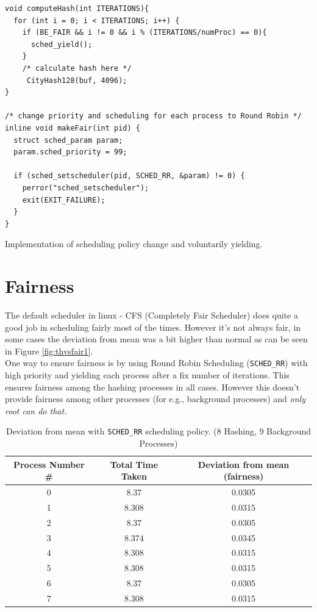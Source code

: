 \documentclass[10pt] {article}
\begin{document}
\begin{listing}[ht!]
\begin{verbatim}
void computeHash(int ITERATIONS){
  for (int i = 0; i < ITERATIONS; i++) {
    if (BE_FAIR && i != 0 && i % (ITERATIONS/numProc) == 0){
      sched_yield();
    }
    /* calculate hash here */
     CityHash128(buf, 4096);
}

/* change priority and scheduling for each process to Round Robin */
inline void makeFair(int pid) {
  struct sched_param param;
  param.sched_priority = 99;
	
  if (sched_setscheduler(pid, SCHED_RR, &param) != 0) {
    perror("sched_setscheduler");
    exit(EXIT_FAILURE);
  }
}
\end{verbatim}
\label{lst:sched}
\caption{Implementation of scheduling policy change and voluntarily yielding.}
\end{listing}

\section{Fairness}
The default scheduler in linux - CFS (Completely Fair Scheduler) does quite a good job in scheduling fairly most of the times. However it's not always fair, in some cases the deviation from mean was a bit higher than normal as can be seen in Figure \ref{fig:thvsfair1}. \\


\noindent One way to ensure fairness is by using Round Robin Scheduling (\texttt{SCHED\_RR}) with high priority and yielding each process after a fix number of iterations. This ensures fairness among the hashing processes in all cases. However this doesn't provide fairness among other processes (for e.g., background processes) and \emph{only root can do that.} \\

\begin{table}
\centering
\begin{tabular}{ |c|c|c|} 
 \hline
\textbf{Process Number \#} & \textbf{Total Time Taken} & \textbf{Deviation from mean (fairness)}\\
\hline
0 & 8.37 & 0.0305 \\
1 & 8.308 & 0.0315 \\
2 & 8.37 & 0.0305 \\
3 & 8.374 & 0.0345 \\
4 & 8.308 & 0.0315 \\
5 & 8.308 & 0.0315 \\
6 & 8.37 & 0.0305 \\
7 & 8.308 & 0.0315 \\
\hline 
\end{tabular}
\caption{Deviation from mean with \texttt{SCHED\_RR} scheduling policy. (8 Hashing, 9 Background Processes)}
\label{table:schedpolicy}
\end{table}
\end{document}
